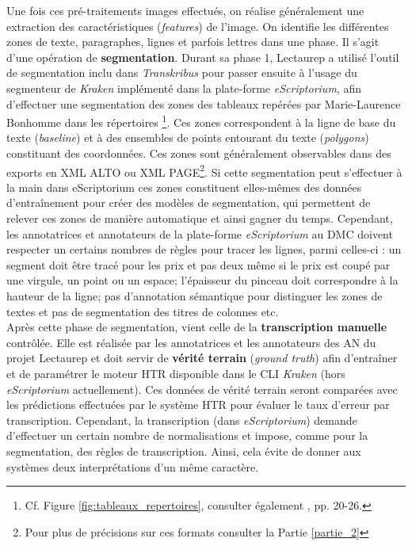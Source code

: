 Une fois ces pré-traitements images effectués, on réalise généralement une extraction des caractéristiques (\textit{features}) de l'image. On identifie les différentes zones de texte, paragraphes, lignes et parfois lettres dans une phase. Il s'agit d'une opération de \textbf{segmentation}. Durant sa phase 1, Lectaurep a utilisé l'outil de segmentation inclu dans \textit{Transkribus} pour passer ensuite à l'usage du segmenteur de \textit{Kraken} implémenté dans la plate-forme \textit{eScriptorium}, afin d'effectuer une segmentation des zones des tableaux repérées par Marie-Laurence Bonhomme dans les répertoires \footnote{Cf. Figure \ref{fig:tableaux_repertoires}, consulter également \cite{bonhomme_defis_2018}, pp. 20-26.}. Ces zones correspondent à la ligne de base du texte (\textit{baseline}) et à des ensembles de points entourant du texte (\textit{polygons}) constituant des coordonnées. Ces zones sont généralement observables dans des exports en XML ALTO ou XML PAGE\footnote{Pour plus de précisions sur ces formats consulter la Partie \ref{partie_2}}. Si cette segmentation peut s'effectuer à la main dans eScriptorium ces zones constituent elles-mêmes des données d'entraînement pour créer des modèles de segmentation, qui permettent de relever ces zones de manière automatique et ainsi gagner du temps. Cependant, les annotatrices et annotateurs de la plate-forme \textit{eScriptorium} au DMC doivent respecter un certains nombres de règles pour tracer les lignes, parmi celles-ci : un segment doit être tracé pour les prix et pas deux même si le prix est coupé par une virgule, un point ou un espace; l'épaisseur du pinceau doit correspondre à la hauteur de la ligne; pas d'annotation sémantique pour distinguer les zones de textes et pas de segmentation des titres de colonnes etc.\\

Après cette phase de segmentation, vient celle de la \textbf{transcription manuelle} contrôlée. Elle est réalisée par les annotatrices et les annotateurs des AN du projet Lectaurep et doit servir de \textbf{vérité terrain} (\textit{ground truth}) afin d'entraîner et de paramétrer le moteur HTR disponible dans le CLI \textit{Kraken} (hors \textit{eScriptorium} actuellement). Ces données de vérité terrain seront comparées avec les prédictions effectuées par le système HTR pour évaluer le taux d'erreur par transcription. Cependant, la transcription  (dans \textit{eScriptorium}) demande d'effectuer un certain nombre de normalisations et impose, comme pour la segmentation, des règles de transcription. Ainsi, cela évite de donner aux systèmes deux interprétations d'un même caractère.\\

